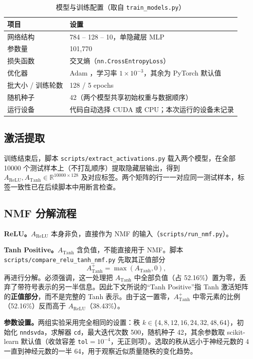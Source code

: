 \documentclass[UTF8,a4paper,11pt]{ctexart}
\newcommand{\Arelu}{A_{\mathrm{ReLU}}}
\newcommand{\Atanh}{A_{\mathrm{Tanh}}}
\newcommand{\Apos}{A^{+}_{\mathrm{Tanh}}}
\newcommand{\code}[1]{\texttt{\small #1}}
\begin{document}
\begin{table}[htbp]
  \centering
  \caption{模型与训练配置（取自 \code{train\_models.py}）}
  \label{tab:config}
  \begin{tabular}{ll}
    \toprule
    项目 & 设置 \\
    \midrule
    网络结构 & 784 -- 128 -- 10，单隐藏层 MLP \\
    参数量 & 101{,}770 \\
    损失函数 & 交叉熵（\code{nn.CrossEntropyLoss}） \\
    优化器 & Adam \cite{kingma2015adam}，学习率 $1\times10^{-3}$，其余为 PyTorch 默认值 \\
    批大小 / 训练轮数 & 128 / 5 epochs \\
    随机种子 & 42（两个模型共享初始权重与数据顺序） \\
    运行设备 & 代码自动选择 CUDA 或 CPU；本次运行的设备未记录 \\
    \bottomrule
  \end{tabular}
\end{table}

\subsection{激活提取}

训练结束后，脚本 \code{scripts/extract\_activations.py} 载入两个模型，在全部 10000 个测试样本上（不打乱顺序）提取隐藏层输出，得到 $\Arelu,\Atanh\in\mathbb{R}^{10000\times128}$ 及对应标签。两个矩阵的行一一对应同一测试样本，标签一致性已在后续脚本中用断言检查。

\subsection{NMF 分解流程}

\textbf{ReLU。}$\Arelu$ 本身非负，直接作为 NMF 的输入（\code{scripts/run\_nmf.py}）。

\textbf{Tanh Positive。}$\Atanh$ 含负值，不能直接用于 NMF。脚本 \code{scripts/\allowbreak compare\_relu\_tanh\_nmf.py} 先取其正值部分
\begin{equation}
  \Apos=\max(\Atanh,0),
\end{equation}
再进行分解。必须强调，这一处理把 $\Atanh$ 中全部负值（占 52.16\%）置为零，丢弃了带符号表示的另一半信息。因此下文所说的“Tanh Positive”指 Tanh 激活矩阵的\textbf{正值部分}，而不是完整的 Tanh 表示。由于这一置零，$\Apos$ 中零元素的比例（52.16\%）反而高于 $\Arelu$（38.43\%）。

\textbf{参数设置。}两组实验采用完全相同的设置：秩 $k\in\{4,8,12,16,24,32,48,64\}$，初始化 \code{nndsvda}，求解器 \code{cd}，最大迭代次数 500，随机种子 42，其余参数取 scikit-learn 默认值（收敛容差 \code{tol}$=10^{-4}$，无正则项）。选取的秩从远小于神经元数的 4 一直到神经元数的一半 64，用于观察近似质量随秩的变化趋势。
\end{document}
